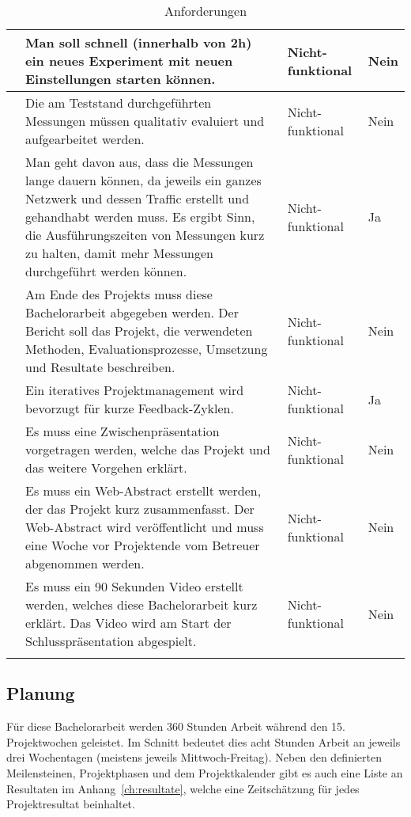 \begin{longtable}{N p{8.5cm} l l}
      & Man soll schnell (innerhalb von 2h) ein neues Experiment mit neuen Einstellungen starten können. & Nicht-funktional & Nein \\ \midrule
      & Die am Teststand durchgeführten Messungen müssen qualitativ evaluiert und aufgearbeitet werden.  & Nicht-funktional & Nein \\ \midrule
      & Man geht davon aus, dass die Messungen lange dauern können, da jeweils ein ganzes Netzwerk und dessen Traffic erstellt und gehandhabt werden muss. Es ergibt Sinn, die Ausführungszeiten von Messungen kurz zu halten, damit mehr Messungen durchgeführt werden können. & Nicht-funktional & Ja \\ \midrule
      & Am Ende des Projekts muss diese Bachelorarbeit abgegeben werden. Der Bericht soll das Projekt, die verwendeten Methoden, Evaluationsprozesse, Umsetzung und Resultate beschreiben.
                & Nicht-funktional & Nein \\ \midrule
      & Ein iteratives Projektmanagement wird bevorzugt für kurze Feedback-Zyklen. & Nicht-funktional & Ja \\ \midrule
      & Es muss eine Zwischenpräsentation vorgetragen werden, welche das Projekt und das weitere Vorgehen erklärt.
                & Nicht-funktional & Nein \\ \midrule
      & Es muss ein Web-Abstract erstellt werden, der das Projekt kurz zusammenfasst. Der Web-Abstract wird veröffentlicht und muss eine Woche vor Projektende vom Betreuer abgenommen werden.
                & Nicht-funktional & Nein \\ \midrule
      & Es muss ein 90 Sekunden Video erstellt werden, welches diese Bachelorarbeit kurz erklärt. Das Video wird am Start der Schlusspräsentation abgespielt.
                & Nicht-funktional & Nein \\ \midrule
    \bottomrule
    \caption{Anforderungen}\label{tab:anforderungen}
\end{longtable}

\subsection{Planung}
\label{sec:Planung}

Für diese Bachelorarbeit werden 360 Stunden Arbeit während den 15. Projektwochen geleistet.
Im Schnitt bedeutet dies acht Stunden Arbeit an jeweils drei Wochentagen (meistens jeweils Mittwoch-Freitag).
Neben den definierten Meilensteinen, Projektphasen und dem Projektkalender gibt es auch eine Liste an Resultaten im Anhang~\ref{ch:resultate}, welche eine Zeitschätzung für jedes Projektresultat beinhaltet.

